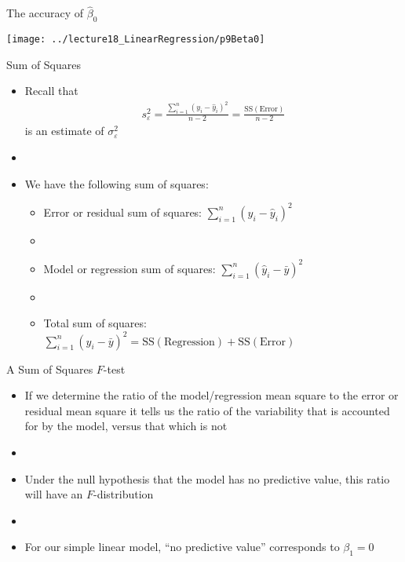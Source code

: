 \documentclass[xcolor=dvipsnames]{beamer}
\begin{document}
\begin{frame}{The accuracy of $\hat{\beta}_0$}
\begin{center}
	\texttt{[image: ../lecture18\_LinearRegression/p9Beta0]}
\end{center}
\end{frame}

\begin{frame}{Sum of Squares}
	\begin{itemize}
		\item Recall that
		\begin{gather*}
		s^2_{\varepsilon} = \frac{\sum_{i=1}^{n}\left(y_i - \hat{y}_i\right)^2}{n-2} = \frac{\text{SS}(\text{Error})}{n-2}
		\end{gather*}
		is an estimate of $\sigma_{\varepsilon}^2$
		\item[]
		\item We have the following sum of squares:
		\begin{itemize}
			\item Error or residual sum of squares: $\sum_{i=1}^n (y_i - \hat{y}_i)^2$
			\item[]
			\item Model or regression sum of squares: $\sum_{i=1}^n (\hat{y}_i-\bar{y})^2$
			\item[]
			\item Total sum of squares: $\sum_{i=1}^n (y_i -\bar{y})^2 = \text{SS}(\text{Regression})+\text{SS}(\text{Error})$
		\end{itemize}
	\end{itemize}
\end{frame}

\begin{frame}{A Sum of Squares $F$-test}
	\begin{itemize}
		\item If we determine the ratio of the model/regression mean square to the error or residual mean square it tells us the ratio of the variability that is accounted for by the model, versus that which is not
		\item[]
		\item Under the null hypothesis that the model has no predictive value, this ratio will have an $F$-distribution 
		\item[]
		\item For our simple linear model, ``no predictive value'' corresponds to $\beta_1 = 0$
	\end{itemize}
\end{frame}
\end{document}
